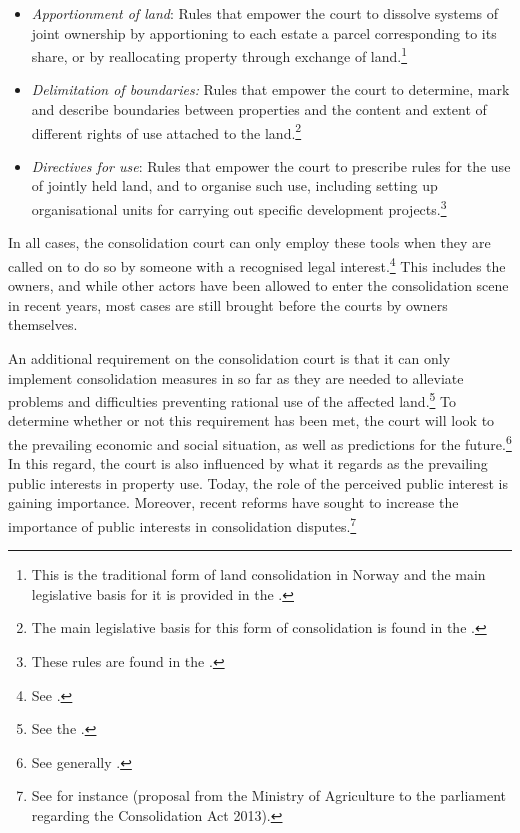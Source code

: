 \begin{itemize}
\item \emph{Apportionment of land}: Rules that empower the court to dissolve systems of joint ownership by apportioning to each estate a parcel corresponding to its share, or by reallocating property through exchange of land.\footnote{This is the traditional form of land consolidation in Norway and the main legislative basis for it is provided in the \cite[2 a)-b)]{lca79}.}
\item \emph{Delimitation of boundaries:} Rules that empower the court to determine, mark and describe boundaries between properties and the content and extent of different rights of use attached to the land.\footnote{The main legislative basis for this form of consolidation is found in the \cite[88]{lca79}.}
\item \emph{Directives for use}: Rules that empower the court to prescribe rules for the use of jointly held land, and to organise such use, including setting up organisational units for carrying out specific development projects.\footnote{These rules are found in the \cite[2 c)|34-35]{lca79}.}
\end{itemize}

In all cases, the consolidation court can only employ these tools when they are called on to do so by someone with a recognised legal interest.\footnote{See \cite[5]{lca79}.} This includes the owners, and while other actors have been allowed to enter the consolidation scene in recent years, most cases are still brought before the courts by owners themselves.

An additional requirement on the consolidation court is that it can only implement consolidation measures in so far as they are needed to alleviate problems and difficulties preventing rational use of the affected land.\footnote{See the \cite[1]{lca79}.} To determine whether or not this requirement has been met, the court will look to the prevailing economic and social situation, as well as predictions for the future.\footnote{See generally \cite{reiten09}.} In this regard, the court is also influenced by what it regards as the prevailing public interests in property use. Today, the role of the perceived public interest is gaining importance. Moreover,  recent reforms have sought to increase the importance of public interests in consolidation disputes.\footnote{See for instance \cite{prop12} (proposal from the Ministry of Agriculture to the parliament regarding the Consolidation Act 2013).}

